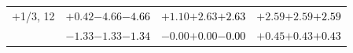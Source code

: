 \documentclass[compress]{beamer}
\begin{document}
\begin{frame}
\begin{tabular}{r | c | c | c}
$+$1/3, 12 & $+0.42$\hspace{0.1 cm}$-4.66$\hspace{0.1 cm}\textcolor{black}{$-4.66$} & $+1.10$\hspace{0.1 cm}$+2.63$\hspace{0.1 cm}\textcolor{black}{$+2.63$} & $+2.59$\hspace{0.1 cm}$+2.59$\hspace{0.1 cm}\textcolor{black}{$+2.59$} \\
           & $-1.33$\hspace{0.1 cm}$-1.33$\hspace{0.1 cm}\textcolor{black}{$-1.34$} & $-0.00$\hspace{0.1 cm}$+0.00$\hspace{0.1 cm}\textcolor{black}{$-0.00$} & $+0.45$\hspace{0.1 cm}$+0.43$\hspace{0.1 cm}\textcolor{black}{$+0.43$} \\
\end{tabular}
\end{frame}
\end{document}
